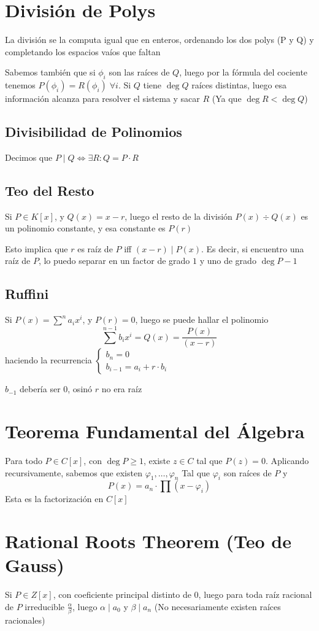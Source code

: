 \documentclass{article}
\begin{document}
\section{División de Polys}

La división se la computa igual que en enteros, ordenando los dos polys (P y
Q) y completando los espacios vaíos que faltan

Sabemos también que si $\phi_i$ son las raíces de $Q$, luego por la fórmula
del cociente tenemos $P(\phi_i) = R(\phi_i) \;\forall i$. Si $Q$ tiene $\deg
Q$ raíces distintas, luego esa información alcanza para resolver el sistema
y sacar $R$ (Ya que $\deg R < \deg Q$)

\subsection{Divisibilidad de Polinomios}
Decimos que $P\mid Q \iff \exists R : Q = P \cdot R$

\subsection{Teo del Resto}
Si $P \in K[x]$, y $Q(x) = x - r$, luego el resto de la división
$P(x) \div Q(x)$ es un polinomio constante, y esa constante es $P(r)$

Esto implica que $r$ es raíz de $P$ iff $(x - r) \mid P(x)$. Es decir, si
encuentro una raíz de $P$, lo puedo separar en un factor de grado $1$ y uno
de grado $\deg P - 1$

\subsection{Ruffini}
Si $P(x) = \sum^n a_ix^i$, y $P(r) = 0$, luego se puede hallar el polinomio
\[
\sum ^{n-1} b_ix^i = Q(x) = \frac{P(x)}{(x - r)}
\]
haciendo la recurrencia \(
\begin{cases}
b_n = 0 \\
b_{i-1} = a_i + r \cdot b_{i}
\end{cases}
\)

$b_{-1}$ debería ser $0$, osinó $r$ no era raíz

\section{Teorema Fundamental del Álgebra}
Para todo $P \in C[x]$, con $\deg P \geq 1$, existe $z \in C$ tal que $P(z)
= 0$. Aplicando recursivamente, sabemos que existen $\varphi_1, \dots,
\varphi_{n}$ Tal que $\varphi_i$ son raíces de $P$ y
\[P(x) = a_n \cdot \prod (x - \varphi_i)\]
Esta es la factorización en $C[x]$

\section {Rational Roots Theorem (Teo de Gauss)}
Si $P \in Z[x]$, con coeficiente principal distinto de 0,
luego para toda raíz racional de $P$ irreducible
$\frac{\alpha}{\beta}$, luego $\alpha \mid a_0$ y $\beta \mid a_n$
(No necesariamente existen raíces racionales)
\end{document}
